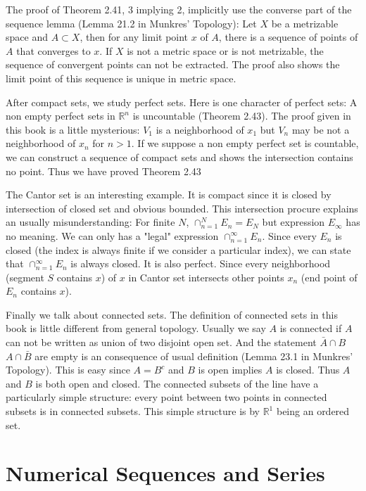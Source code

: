 The proof of Theorem 2.41, 3 implying 2, implicitly use the converse part of the sequence lemma (Lemma 21.2 in Munkres' Topology): Let $X$ be a metrizable space and $A\subset X$, then for any limit point $x$ of $A$, there is a sequence of points of $A$ that converges to $x$. If $X$ is not a metric space or is not metrizable, the sequence of convergent points can not be extracted. The proof also shows the limit point of this sequence is unique in metric space.\par
After compact sets, we study perfect sets. Here is one character of perfect sets: A non empty perfect sets in $\mathbb{R}^n$ is uncountable (Theorem 2.43). The proof given in this book is a little mysterious: $V_1$ is a neighborhood of $x_1$ but $V_n$ may be not a neighborhood of $x_n$ for $n>1$. If we suppose a non empty perfect set is countable, we can construct a sequence of compact sets and shows the intersection contains no point. Thus we have proved Theorem 2.43\par
The Cantor set is an interesting example. It is compact since it is closed by intersection of closed set and obvious bounded. This intersection procure explains an usually misunderstanding: For finite $N$, $\cap_{n=1}^N E_n=E_N$ but expression $E_\infty$ has no meaning. We can only has a "legal" expression $\cap_{n=1}^\infty E_n$. Since every $E_n$ is closed (the index is always finite if we consider a particular index), we can state that $\cap_{n=1}^\infty E_n$ is always closed. It is also perfect. Since every neighborhood (segment $S$ contains $x$) of $x$ in Cantor set intersects other points $x_n$ (end point of $E_n$ contains $x$). \par
Finally we talk about connected sets. The definition of connected sets in this book is little different from general topology. Usually we say $A$ is connected if $A$ can not be written as union of two disjoint open set. And the statement $\bar{A}\cap B$ $A\cap \bar{B}$ are empty is an consequence of usual definition (Lemma 23.1 in Munkres' Topology). This is easy since $A=B^c$ and $B$ is open implies $A$ is closed. Thus $A$ and $B$ is both open and closed. The connected subsets of the line have a particularly simple structure: every point between two points in connected subsets is in connected subsets. This simple structure is by $\mathbb{R}^1$ being an ordered set.
\chapter{Numerical Sequences and Series}
